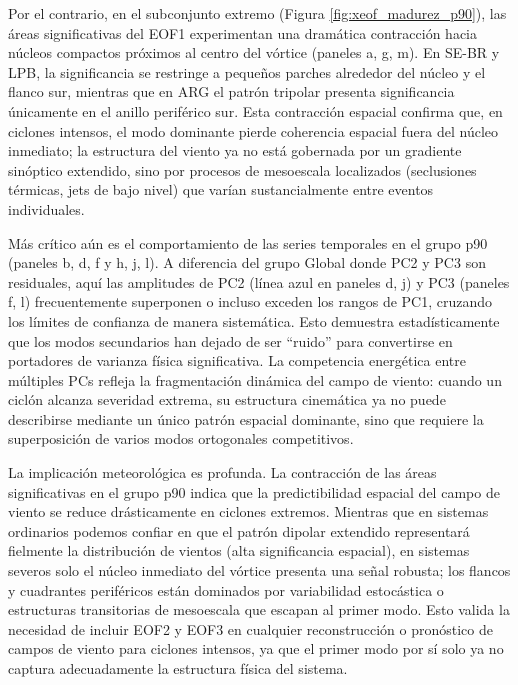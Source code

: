 Por el contrario, en el subconjunto extremo (Figura \ref{fig:xeof_madurez_p90}), las áreas significativas del EOF1 experimentan una dramática contracción hacia núcleos compactos próximos al centro del vórtice (paneles a, g, m). En SE-BR y LPB, la significancia se restringe a pequeños parches alrededor del núcleo y el flanco sur, mientras que en ARG el patrón tripolar presenta significancia únicamente en el anillo periférico sur. Esta contracción espacial confirma que, en ciclones intensos, el modo dominante pierde coherencia espacial fuera del núcleo inmediato; la estructura del viento ya no está gobernada por un gradiente sinóptico extendido, sino por procesos de mesoescala localizados (seclusiones térmicas, jets de bajo nivel) que varían sustancialmente entre eventos individuales.

Más crítico aún es el comportamiento de las series temporales en el grupo p90 (paneles b, d, f y h, j, l). A diferencia del grupo Global donde PC2 y PC3 son residuales, aquí las amplitudes de PC2 (línea azul en paneles d, j) y PC3 (paneles f, l) frecuentemente superponen o incluso exceden los rangos de PC1, cruzando los límites de confianza de manera sistemática. Esto demuestra estadísticamente que los modos secundarios han dejado de ser ``ruido'' para convertirse en portadores de varianza física significativa. La competencia energética entre múltiples PCs refleja la fragmentación dinámica del campo de viento: cuando un ciclón alcanza severidad extrema, su estructura cinemática ya no puede describirse mediante un único patrón espacial dominante, sino que requiere la superposición de varios modos ortogonales competitivos.

La implicación meteorológica es profunda. La contracción de las áreas significativas en el grupo p90 indica que la predictibilidad espacial del campo de viento se reduce drásticamente en ciclones extremos. Mientras que en sistemas ordinarios podemos confiar en que el patrón dipolar extendido representará fielmente la distribución de vientos (alta significancia espacial), en sistemas severos solo el núcleo inmediato del vórtice presenta una señal robusta; los flancos y cuadrantes periféricos están dominados por variabilidad estocástica o estructuras transitorias de mesoescala que escapan al primer modo. Esto valida la necesidad de incluir EOF2 y EOF3 en cualquier reconstrucción o pronóstico de campos de viento para ciclones intensos, ya que el primer modo por sí solo ya no captura adecuadamente la estructura física del sistema.


